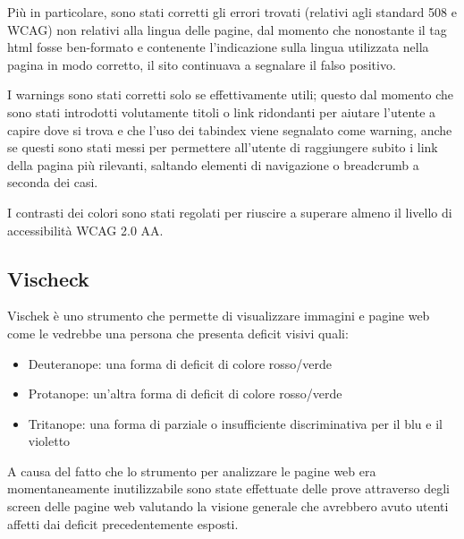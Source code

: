 Più in particolare, sono stati corretti gli errori trovati (relativi agli
standard 508 e WCAG) non relativi alla lingua delle pagine, dal momento che
nonostante il tag html fosse ben-formato e contenente l'indicazione sulla
lingua utilizzata nella pagina in modo corretto, il sito continuava a
segnalare il falso positivo.

I warnings sono stati corretti solo se effettivamente utili; questo dal
momento che sono stati introdotti volutamente titoli o link ridondanti per
aiutare l'utente a capire dove si trova e che l'uso dei tabindex viene
segnalato come warning, anche se questi sono stati messi per permettere
all'utente di raggiungere subito i link della pagina più rilevanti, saltando
elementi di navigazione o breadcrumb a seconda dei casi.

I contrasti dei colori sono stati regolati per riuscire a superare almeno il
livello di accessibilità WCAG 2.0 AA.

\subsection{Vischeck}
Vischek è uno strumento che permette di visualizzare immagini e pagine web
come le vedrebbe una persona che presenta deficit visivi quali:
\begin{itemize}
\item Deuteranope: una forma di deficit di colore rosso/verde
\item Protanope: un'altra forma di deficit di colore rosso/verde
\item Tritanope: una forma di parziale o insufficiente discriminativa per il blu e il violetto
\end{itemize}
A causa del fatto che lo strumento per analizzare le pagine web era momentaneamente inutilizzabile sono state effettuate delle prove attraverso degli screen delle pagine web
valutando la visione generale che avrebbero avuto utenti affetti dai deficit precedentemente
esposti.

